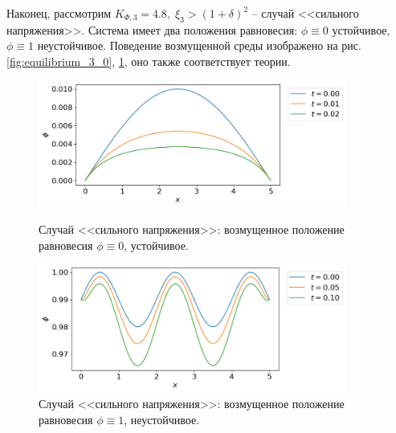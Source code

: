 Наконец, рассмотрим $K_{\Phi, 3} = 4.8, \; \xi_3 > (1 + \delta)^2$ -- случай <<сильного напряжения>>. Система имеет два положения равновесия: $\phi \equiv 0$ устойчивое, $\phi \equiv 1$ неустойчивое. Поведение возмущенной среды изображено на рис. \ref{fig:equilibrium_3_0}, \ref{fig:equilibrium_3_1}, оно также соответствует теории.

\begin{figure}[!t]
	\centering
	\includegraphics[width=0.9\textwidth]{figures/equilibrium_3_0.png}
	\vspace{-0.3cm}
	\caption{Случай <<сильного напряжения>>: возмущенное положение равновесия $\phi \equiv 0$, устойчивое.}
	\label{fig:equilibrium_3_0}
	\vspace{0.5cm}
	
	\includegraphics[width=0.9\textwidth]{figures/equilibrium_3_1.png}
	\vspace{-0.3cm}
	\caption{Случай <<сильного напряжения>>: возмущенное положение равновесия $\phi \equiv 1$, неустойчивое.}
	\label{fig:equilibrium_3_1}
\end{figure}